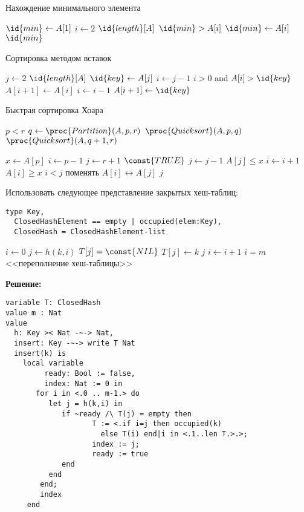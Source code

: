

\z Нахождение минимального элемента
\begin{codebox}
\li $\id{min} \gets A[1]$
\li \For $i \gets 2$ \To $\id{length}[A]$
\li \Do \If $\id{min} > A[i]$
\li \Then $\id{min} \gets A[i]$ \End \End
\li \Return $\id{min}$
\end{codebox}

\z Сортировка методом вставок
\begin{codebox}
\li \For $j \gets 2$ \To $\id{length}[A]$
\li \Do $\id{key} \gets A[j]$
\li $i \gets j-1$
\li \While $i > 0$ and $A[i] > \id{key}$
\li \Do $A[i+1] \gets A[i]$
\li $i \gets i-1$ \End
\li $A[i+1] \gets \id{key}$ \End
\end{codebox}

\z Быстрая сортировка Хоара
\begin{codebox}
\li \If $p < r$
\li \Then $q \gets \proc{Partition}(A, p, r)$
\li $\proc{Quicksort}(A, p, q)$
\li $\proc{Quicksort}(A, q+1, r)$ \End
\end{codebox}

\begin{codebox}
\li $x \gets A[p]$
\li $i \gets p-1$
\li $j \gets r+1$
\li \While $\const{TRUE}$
\li \Do \Repeat $j \gets j-1$
\li \Until $A[j] \leqslant x$
\li \Repeat $i \gets i+1$
\li \Until $A[i] \geqslant x$
\li \If $i < j$
\li \Then $\mbox{поменять~} A[i] \leftrightarrow A[j]$
\li \Else \Return $j$ \End \End
\end{codebox}

\z Использовать следующее представление закрытых хеш-таблиц:
\begin{lstlisting}
type Key,
  ClosedHashElement == empty | occupied(elem:Key),
  ClosedHash = ClosedHashElement-list
\end{lstlisting}

\begin{codebox}
\li $i \gets 0$
\li \Repeat $j \gets h(k,i)$
\li \If $T[j] = \const{NIL}$
\li \Then $T[j] \gets k$
\li \Return $j$
\li \Else $i \gets i+1$ \End
\li \Until $i = m$ \End
\li \Error <<переполнение хеш-таблицы>>
\end{codebox}

\textbf{Решение:}
\begin{lstlisting}
variable T: ClosedHash
value m : Nat
value
  h: Key >< Nat -~-> Nat,
  insert: Key -~-> write T Nat
  insert(k) is
    local variable
         ready: Bool := false,
         index: Nat := 0 in
       for i in <.0 .. m-1.> do
          let j = h(k,i) in
             if ~ready /\ T(j) = empty then
                    T := <.if i=j then occupied(k)
                      else T(i) end|i in <.1..len T.>.>;
                    index := j;
                    ready := true
             end
          end
        end;
        index
     end
\end{lstlisting}

